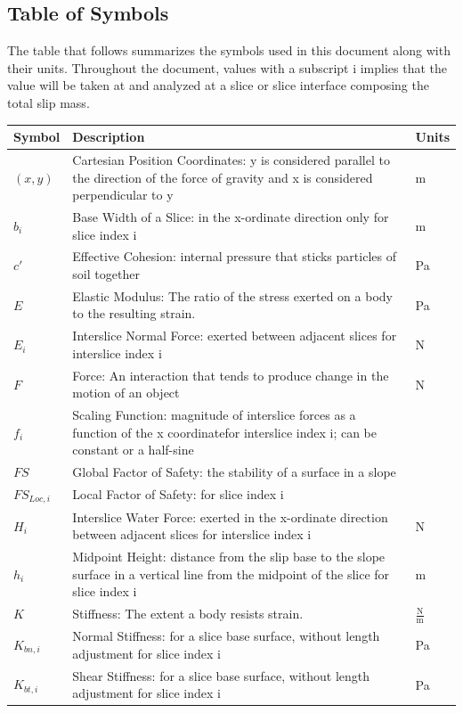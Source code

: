 \documentclass[12pt]{article}
\begin{document}
\subsection{Table of Symbols}
\label{Sec:TablofSymb}
The table that follows summarizes the symbols used in this document along with their units. Throughout the document, values with a subscript i implies that the value will be taken at and analyzed at a slice or slice interface composing the total slip mass.
\begin{longtable*}{l l l}
\toprule
Symbol & Description & Units
\\
\midrule
$(x,y)$ & Cartesian Position Coordinates: y is considered parallel to the direction of the force of gravity and x is considered perpendicular to y & m
\\
$b_{i}$ & Base Width of a Slice: in the x-ordinate direction only for slice index i & m
\\
$c'$ & Effective Cohesion: internal pressure that sticks particles of soil together & Pa
\\
$E$ & Elastic Modulus: The ratio of the stress exerted on a body to the resulting strain. & Pa
\\
$E_{i}$ & Interslice Normal Force: exerted between adjacent slices for interslice index i & N
\\
$F$ & Force: An interaction that tends to produce change in the motion of an object & N
\\
$f_{i}$ & Scaling Function: magnitude of interslice forces as a function of the x coordinatefor interslice index i; can be constant or a half-sine & 
\\
$FS$ & Global Factor of Safety: the stability of a surface in a slope & 
\\
$FS_{Loc,i}$ & Local Factor of Safety: for slice index i & 
\\
$H_{i}$ & Interslice Water Force: exerted in the x-ordinate direction between adjacent slices for interslice index i & N
\\
$h_{i}$ & Midpoint Height: distance from the slip base to the slope surface in a vertical line from the midpoint of the slice for slice index i & m
\\
$K$ & Stiffness: The extent a body resists strain. & $\frac{\text{N}}{\text{m}}$
\\
$K_{bn,i}$ & Normal Stiffness: for a slice base surface, without length adjustment for slice index i & Pa
\\
$K_{bt,i}$ & Shear Stiffness: for a slice base surface, without length adjustment for slice index i & Pa

\end{longtable*}
\end{document}
